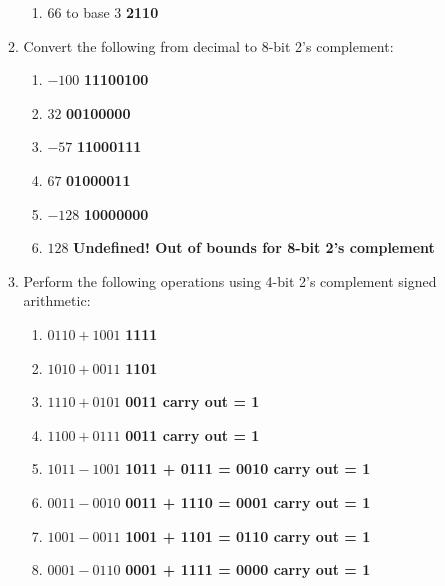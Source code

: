 \documentclass[10pt]{article}
\begin{document}
\begin{itemize}
\begin{enumerate}
\begin{enumerate}[label=\Alph*]
\item $66$ to base 3  \textbf{2110}
\end{enumerate}

\item Convert the following from decimal to 8-bit 2's complement:
\begin{enumerate}[label=\Alph*]


\item $-100$   \textbf{11100100}

\item $32$   \textbf{00100000}

\item $-57$  \textbf{11000111}

\item $67$   \textbf{01000011}

\item $-128$  \textbf{10000000}

\item $128$  \textbf{Undefined!  Out of bounds for 8-bit 2's complement}

\end{enumerate}

\item Perform the following operations using 4-bit 2's complement signed arithmetic:
\begin{enumerate}[label=\Alph*]


\item $0110 + 1001$    \textbf{1111}

\item $1010 + 0011$    \textbf{1101}

\item $1110 + 0101$    \textbf{0011  carry out = 1}

\item $1100 + 0111$   \textbf{0011  carry out = 1}

\item $1011 - 1001$   \textbf{1011 + 0111 = 0010 carry out = 1}

\item $0011 - 0010$   \textbf{0011 + 1110 = 0001 carry out = 1}

\item $1001 - 0011$  \textbf{1001 + 1101 = 0110 carry out = 1}

\item $0001 - 0110$  \textbf{0001 + 1111 = 0000 carry out = 1}


\end{enumerate}


\end{enumerate}
\end{itemize}
\end{document}
